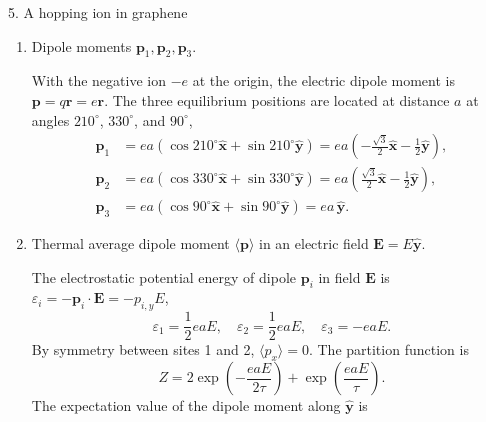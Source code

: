 \documentclass[11pt]{article}
\begin{document}
\begin{problem}{5. A hopping ion in graphene}\hfill
  \begin{enumerate}[label=(\alph*)]
    \item Dipole moments \( \mathbf{p}_1, \mathbf{p}_2, \mathbf{p}_3 \).
    \begin{answer}
      With the negative ion \( -e \) at the origin, the electric dipole moment is \( \mathbf{p} = q\mathbf{r} = e\mathbf{r} \). The three equilibrium positions are located at distance \( a \) at angles \( 210^\circ \), \( 330^\circ \), and \( 90^\circ \),
      \begin{equation}
      \label{eq:20}
      \begin{aligned}
        \mathbf{p}_1 &= ea \left(\cos 210^\circ \hat{\mathbf{x}} + \sin 210^\circ \hat{\mathbf{y}}\right) = ea \left( -\frac{\sqrt{3}}{2} \hat{\mathbf{x}} - \frac{1}{2} \hat{\mathbf{y}} \right), \\[1.5ex]
        \mathbf{p}_2 &= ea \left(\cos 330^\circ \hat{\mathbf{x}} + \sin 330^\circ \hat{\mathbf{y}}\right) = ea \left( \frac{\sqrt{3}}{2} \hat{\mathbf{x}} - \frac{1}{2} \hat{\mathbf{y}} \right), \\[1.5ex]
        \mathbf{p}_3 &= ea \left(\cos 90^\circ \hat{\mathbf{x}} + \sin 90^\circ \hat{\mathbf{y}}\right) = ea\,\hat{\mathbf{y}}.
      \end{aligned}
      \end{equation}
    \end{answer}
    \item Thermal average dipole moment \( \langle \mathbf{p} \rangle \) in an electric field \( \mathbf{E} = E\hat{\mathbf{y}} \).
    \begin{answer}
      The electrostatic potential energy of dipole \( \mathbf{p}_i \) in field \( \mathbf{E} \) is \( \varepsilon_i = -\mathbf{p}_i \cdot \mathbf{E} = -p_{i,y} E \),
      \begin{equation}
        \varepsilon_1 = \frac{1}{2}eaE, \quad \varepsilon_2 = \frac{1}{2}eaE, \quad \varepsilon_3 = -eaE.
      \end{equation}
      By symmetry between sites 1 and 2, \( \langle p_x \rangle = 0 \). The partition function is
      \begin{equation}
        Z = 2\exp\left(-\frac{eaE}{2\tau}\right) + \exp\left(\frac{eaE}{\tau}\right).
      \end{equation}
      The expectation value of the dipole moment along \( \hat{\mathbf{y}} \) is
      \begin{equation}

\end{equation}
\end{answer}
\end{enumerate}
\end{problem}
\end{document}
